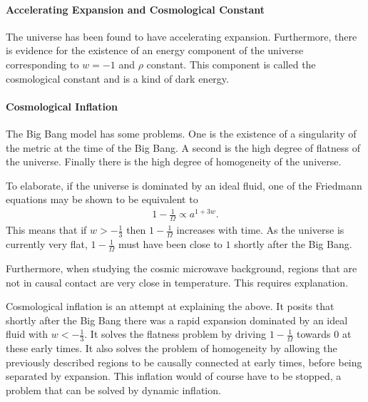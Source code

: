 \paragraph{Accelerating Expansion and Cosmological Constant}
The universe has been found to have accelerating expansion. Furthermore, there is evidence for the existence of an energy component of the universe corresponding to $w = -1$ and $\rho$ constant. This component is called the cosmological constant and is a kind of dark energy.

\paragraph{Cosmological Inflation}
The Big Bang model has some problems. One is the existence of a singularity of the metric at the time of the Big Bang. A second is the high degree of flatness of the universe. Finally there is the high degree of homogeneity of the universe.

To elaborate, if the universe is dominated by an ideal fluid, one of the Friedmann equations may be shown to be equivalent to
\begin{align*}
	1 - \frac{1}{\Omega} \propto a^{1 + 3w}.
\end{align*}
This means that if $w > -\frac{1}{3}$ then $1 - \frac{1}{\Omega}$ increases with time. As the universe is currently very flat, $1 - \frac{1}{\Omega}$ must have been close to $1$ shortly after the Big Bang.

Furthermore, when studying the cosmic microwave background, regions that are not in causal contact are very close in temperature. This requires explanation.

Cosmological inflation is an attempt at explaining the above. It posits that shortly after the Big Bang there was a rapid expansion dominated by an ideal fluid with $w < -\frac{1}{3}$. It solves the flatness problem by driving $1 - \frac{1}{\Omega}$ towards $0$ at these early times. It also solves the problem of homogeneity by allowing the previously described regions to be causally connected at early times, before being separated by expansion. This inflation would of course have to be stopped, a problem that can be solved by dynamic inflation.